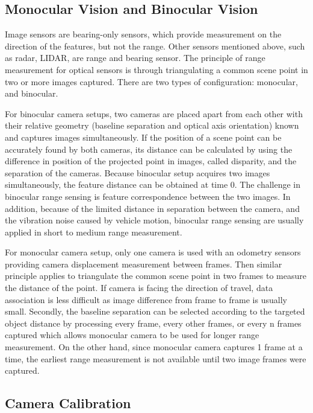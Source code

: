 \subsection{Monocular Vision and Binocular Vision}
Image sensors are bearing-only sensors, which provide measurement on
the direction of the features, but not the range. Other sensors
mentioned above, such as radar, LIDAR, are range and bearing sensor.
The principle of range measurement for optical sensors is through
triangulating a common scene point in two or more images captured.
There are two types of configuration: monocular, and binocular.

For binocular camera setups, two cameras are placed apart from each
other with their relative geometry (baseline separation and optical
axis orientation) known and captures images simultaneously. If the
position of a scene point can be accurately found by both cameras, its
distance can be calculated by using the difference in position of the
projected point in images, called disparity, and the separation of the
cameras. Because binocular setup acquires two images simultaneously,
the feature distance can be obtained at time $0$. The challenge in
binocular range sensing is feature correspondence between the two
images. In addition, because of the limited distance in separation
between the camera, and the vibration noise caused by vehicle motion,
binocular range sensing are usually applied in short to medium range
measurement.

For monocular camera setup, only one camera is used with an odometry
sensors providing camera displacement measurement between frames. Then
similar principle applies to triangulate the common scene point in two
frames to measure the distance of the point. If camera is facing the
direction of travel, data association is less difficult as image
difference from frame to frame is usually small. Secondly, the
baseline separation can be selected according to the targeted object
distance by processing every frame, every other frames, or every n
frames captured which allows monocular camera to be used for longer
range measurement. On the other hand, since monocular camera captures
1 frame at a time, the earliest range measurement is not available
until two image frames were captured.

\subsection{Camera Calibration}

